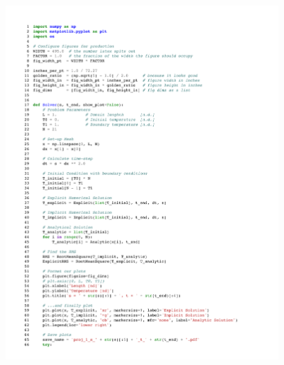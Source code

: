 \documentclass[twocolumn,10pt]{asme2ej}
\begin{document}
\begin{figure}[b]
\begin{center}
\includegraphics[page=1,width=0.93\textwidth]{../Karasinski - Case Study 1.pdf}
\end{center}
\end{figure}
\end{document}
